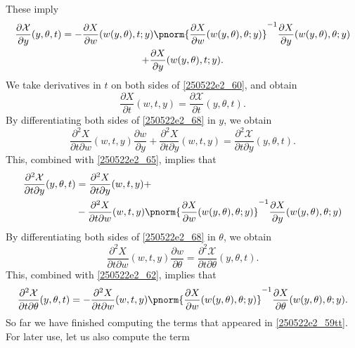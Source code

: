 \documentclass{article}
\numberwithin{equation}{section}
\theoremstyle{plain}
\begin{document}
These imply 
\begin{multline}\label{250522e2_67}
\frac{\partial \mathcal{X}}{\partial y}(y, \theta, t)=
-
\frac{\partial X}{\partial w}(w(y, \theta), t; y)\pnorm{
\frac{\partial X}{\partial w}(w(y, \theta), \theta; y)
}^{-1} \frac{\partial X}{\partial y}(w(y, \theta), \theta; y)\\
+ 
\frac{\partial X}{\partial y}(w(y, \theta), t; y).
\end{multline}
We take derivatives in $t$ on both sides of \eqref{250522e2_60}, and obtain 
\begin{equation}\label{250522e2_68}
\frac{\partial X}{\partial t}(w, t, y)= \frac{\partial{\mathcal{X}}}{\partial t}(y, \theta, t).
\end{equation}
By differentiating both sides of \eqref{250522e2_68} in $y$, we obtain 
\begin{equation}
\frac{\partial^2 X}{\partial t\partial w}(w, t, y)\frac{\partial w}{\partial y}+ 
\frac{\partial^2 X}{\partial t\partial y}(w, t, y)
= \frac{\partial^2{\mathcal{X}}}{\partial t \partial y}(y, \theta, t).
\end{equation}
This, combined with \eqref{250522e2_65}, implies that 
\begin{equation}\label{250522e2_70}
\begin{split}
\frac{\partial^2{\mathcal{X}}}{\partial t \partial y}(y, \theta, t)
&=\frac{\partial^2 X}{\partial t\partial y}(w, t, y)+\\
&
-\frac{\partial^2 X}{\partial t\partial w}(w, t, y)
\pnorm{
\frac{\partial X}{\partial w}(w(y, \theta), \theta; y)
}^{-1} \frac{\partial X}{\partial y}(w(y, \theta), \theta; y)
\end{split}
\end{equation}
By differentiating both sides of \eqref{250522e2_68} in $\theta$, we obtain 
\begin{equation}
\frac{\partial^2 X}{\partial t\partial w}(w, t, y)\frac{\partial w}{\partial \theta}
= \frac{\partial^2{\mathcal{X}}}{\partial t \partial \theta}(y, \theta, t).
\end{equation}
This, combined with \eqref{250522e2_62}, implies that 
\begin{equation}\label{250522e2_72}
\frac{\partial^2{\mathcal{X}}}{\partial t \partial \theta}(y, \theta, t)=-
\frac{\partial^2 X}{\partial t\partial w}(w, t, y)
\pnorm{
\frac{\partial X}{\partial w}(w(y, \theta), \theta; y)
}^{-1} \frac{\partial X}{\partial \theta}(w(y, \theta), \theta; y).
\end{equation}
So far we have finished computing the terms that appeared in \eqref{250522e2_59tt}. For later use, let us also compute the term 
\end{document}
